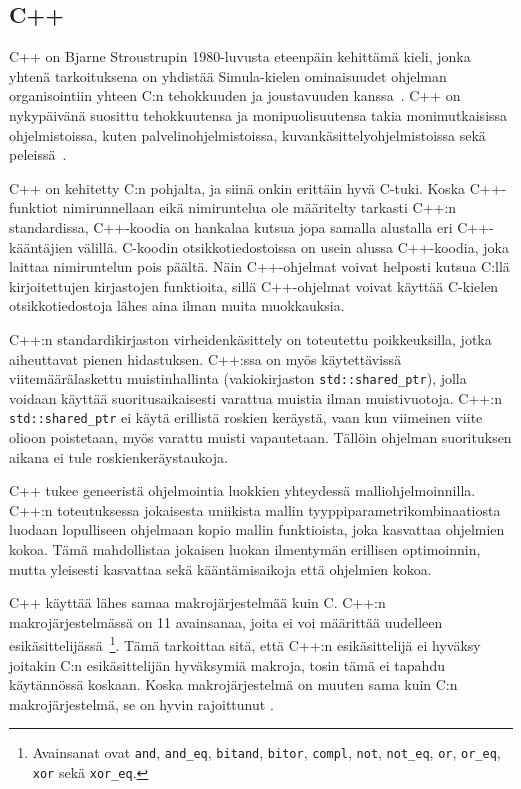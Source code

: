 \subsection{C++}

C++ on Bjarne Stroustrupin 1980-luvusta eteenpäin kehittämä kieli, jonka
yhtenä tarkoituksena on yhdistää Simula-kielen ominaisuudet ohjelman
organisointiin yhteen C:n tehokkuuden ja joustavuuden
kanssa~\citep{cpphistory}. C++ on nykypäivänä suosittu tehokkuutensa ja
monipuolisuutensa takia monimutkaisissa ohjelmistoissa, kuten
palvelinohjelmistoissa, kuvankäsittelyohjelmistoissa sekä
peleissä~\citep{cppapps}.

C++ on kehitetty C:n pohjalta, ja siinä onkin erittäin hyvä C-tuki. Koska
C++\hyp{}funktiot nimirunnellaan eikä nimiruntelua ole määritelty tarkasti C++:n
standardissa, C++-koodia on hankalaa kutsua jopa samalla alustalla eri
C++-kääntäjien välillä. C-koodin otsikkotiedostoissa on
usein alussa C++-koodia, joka laittaa nimiruntelun pois päältä. Näin
C++-ohjelmat voivat helposti kutsua C:llä kirjoitettujen kirjastojen
funktioita, sillä C++-ohjelmat voivat käyttää C-kielen otsikkotiedostoja lähes
aina ilman muita muokkauksia.

C++:n standardikirjaston virheidenkäsittely on toteutettu poikkeuksilla, jotka
aiheuttavat pienen hidastuksen. C++:ssa on myös käytettävissä
viitemäärälaskettu muistinhallinta (vakiokirjaston
\texttt{std::shared\_ptr}), jolla voidaan käyttää suoritusaikaisesti varattua
muistia ilman muistivuotoja. C++:n \texttt{std::shared\_ptr} ei käytä erillistä
roskien keräystä, vaan kun viimeinen viite olioon poistetaan, myös varattu
muisti vapautetaan. Tällöin ohjelman suorituksen aikana ei tule
roskienkeräystaukoja.

C++ tukee geneeristä ohjelmointia luokkien
yhteydessä malliohjelmoinnilla. C++:n
toteutuksessa jokaisesta uniikista mallin tyyppiparametrikombinaatiosta luodaan
lopulliseen ohjelmaan kopio mallin funktioista, joka kasvattaa ohjelmien kokoa.
Tämä mahdollistaa jokaisen luokan ilmentymän erillisen
optimoinnin, mutta yleisesti kasvattaa sekä kääntämisaikoja että ohjelmien
kokoa.

C++ käyttää lähes samaa makrojärjestelmää kuin C. C++:n makrojärjestelmässä on
11 avainsanaa, joita ei voi määrittää uudelleen
esikäsittelijässä~\citep[luku~19.2]{CPP17}\footnote{ Avainsanat ovat
\texttt{and}, \texttt{and\_eq}, \texttt{bitand}, \texttt{bitor},
\texttt{compl}, \texttt{not}, \texttt{not\_eq}, \texttt{or}, \texttt{or\_eq},
\texttt{xor} sekä \texttt{xor\_eq}. }. Tämä tarkoittaa sitä, että C++:n
esikäsittelijä ei hyväksy joitakin C:n esikäsittelijän hyväksymiä makroja,
tosin tämä ei tapahdu käytännössä koskaan. Koska makrojärjestelmä on muuten
sama kuin C:n makrojärjestelmä, se on hyvin rajoittunut \citep[luku~19]{CPP17}.

